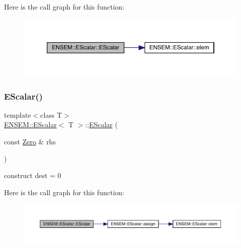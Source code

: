 Here is the call graph for this function\+:
\nopagebreak
\begin{figure}[H]
\begin{center}
\leavevmode
\includegraphics[width=350pt]{d0/d82/classENSEM_1_1EScalar_ad064adaa15e67106893182ba57c6fd91_cgraph}
\end{center}
\end{figure}
\mbox{\label{classENSEM_1_1EScalar_aa50915f887b0e206aecad55b2f25e4de}} 
\subsubsection{\texorpdfstring{EScalar()}{EScalar()}\hspace{0.1cm}{\footnotesize\ttfamily [9/12]}}
{\footnotesize\ttfamily template$<$class T$>$ \\
\mbox{\hyperlink{classENSEM_1_1EScalar}{E\+N\+S\+E\+M\+::\+E\+Scalar}}$<$ T $>$\+::\mbox{\hyperlink{classENSEM_1_1EScalar}{E\+Scalar}} (\begin{DoxyParamCaption}\item[{const \mbox{\hyperlink{structENSEM_1_1Zero}{Zero}} \&}]{rhs }\end{DoxyParamCaption})\hspace{0.3cm}{\ttfamily [inline]}}



construct dest = 0 

Here is the call graph for this function\+:
\nopagebreak
\begin{figure}[H]
\begin{center}
\leavevmode
\includegraphics[width=350pt]{d0/d82/classENSEM_1_1EScalar_aa50915f887b0e206aecad55b2f25e4de_cgraph}
\end{center}
\end{figure}
\mbox{\label{classENSEM_1_1EScalar_a62e800e98a28c98a6d297eb613e86f82}} 
